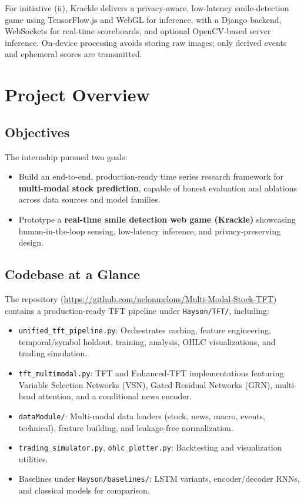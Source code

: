 \documentclass[11pt]{article}
\newcommand{\repoLink}{https://github.com/nelonmelons/Multi-Modal-Stock-TFT}
\begin{document}
For initiative (ii), Krackle delivers a privacy-aware, low-latency smile-detection game using TensorFlow.js and WebGL for inference, with a Django backend, WebSockets for real-time scoreboards, and optional OpenCV-based server inference. On-device processing avoids storing raw images; only derived events and ephemeral scores are transmitted.

\tableofcontents
\listoffigures
\listoftables
\clearpage
{}

\section{Project Overview}
\subsection{Objectives}
The internship pursued two goals:
\begin{itemize}[leftmargin=*]
  \item Build an end-to-end, production-ready time series research framework for \textbf{multi-modal stock prediction}, capable of honest evaluation and ablations across data sources and model families.
  \item Prototype a \textbf{real-time smile detection web game (Krackle)} showcasing human-in-the-loop sensing, low-latency inference, and privacy-preserving design.
\end{itemize}

\subsection{Codebase at a Glance}
The repository (\href{\repoLink}{\repoLink}) contains a production-ready TFT pipeline under \texttt{Hayson/TFT/}, including:\vspace{-2pt}
\begin{itemize}[leftmargin=*]
  \item \texttt{unified\_tft\_pipeline.py}: Orchestrates caching, feature engineering, temporal/symbol holdout, training, analysis, OHLC visualizations, and trading simulation.
  \item \texttt{tft\_multimodal.py}: TFT and Enhanced-TFT implementations featuring Variable Selection Networks (VSN), Gated Residual Networks (GRN), multi-head attention, and a conditional news encoder.
  \item \texttt{dataModule/}: Multi-modal data loaders (stock, news, macro, events, technical), feature building, and leakage-free normalization.
  \item \texttt{trading\_simulator.py}, \texttt{ohlc\_plotter.py}: Backtesting and visualization utilities.
  \item Baselines under \texttt{Hayson/baselines/}: LSTM variants, encoder/decoder RNNs, and classical models for comparison.
\end{itemize}
\end{document}
